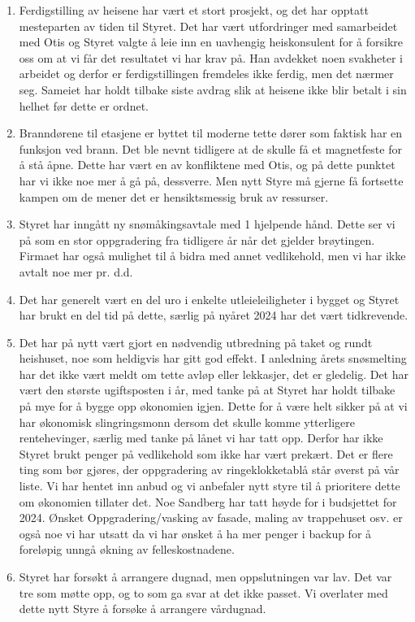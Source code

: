 \documentclass[12pt]{article}
\begin{document}
\begin{enumerate}
\item Ferdigstilling av heisene har vært et stort prosjekt, og det har opptatt mesteparten av tiden til Styret. Det har vært utfordringer med samarbeidet med Otis og Styret valgte å leie inn en uavhengig heiskonsulent for å forsikre oss om at vi får det resultatet vi har krav på. Han avdekket noen svakheter i arbeidet og derfor er ferdigstillingen fremdeles ikke ferdig, men det nærmer seg. Sameiet har holdt tilbake siste avdrag slik at heisene ikke blir betalt i sin helhet før dette er ordnet.
\item Branndørene til etasjene er byttet til moderne tette dører som faktisk har en funksjon ved brann. Det ble nevnt tidligere at de skulle få et magnetfeste for å stå åpne. Dette har vært en av konfliktene med Otis, og på dette punktet har vi ikke noe mer å gå på, dessverre. Men nytt Styre må gjerne få fortsette kampen om de mener det er hensiktsmessig bruk av ressurser.
\item Styret har inngått ny snømåkingsavtale med 1 hjelpende hånd. Dette ser vi på som en stor oppgradering fra tidligere år når det gjelder brøytingen. Firmaet har også mulighet til å bidra med annet vedlikehold, men vi har ikke avtalt noe mer pr. d.d.
\item Det har generelt vært en del uro i enkelte utleieleiligheter i bygget og Styret har brukt en del tid på dette, særlig på nyåret 2024 har det vært tidkrevende.
\item Det har på nytt vært gjort en nødvendig utbredning på taket og rundt heishuset, noe som heldigvis har gitt god effekt. I anledning årets snøsmelting har det ikke vært meldt om tette avløp eller lekkasjer, det er gledelig. Det har vært den største ugiftsposten i år, med tanke på at Styret har holdt tilbake på mye for å bygge opp økonomien igjen. Dette for å være helt sikker på at vi har økonomisk slingringsmonn dersom det skulle komme ytterligere rentehevinger, særlig med tanke på lånet vi har tatt opp. Derfor har ikke Styret brukt penger på vedlikehold som ikke har vært prekært. Det er flere ting som bør gjøres, der oppgradering av ringeklokketablå står øverst på vår liste. Vi har hentet inn anbud og vi anbefaler nytt styre til å prioritere dette om økonomien tillater det. Noe Sandberg har tatt høyde for i budsjettet for 2024. Ønsket Oppgradering/vasking av fasade, maling av trappehuset osv. er også noe vi har utsatt da vi har ønsket å ha mer penger i backup for å foreløpig unngå økning av felleskostnadene.
\item Styret har forsøkt å arrangere dugnad, men oppslutningen var lav. Det var tre som møtte opp, og to som ga svar at det ikke passet. Vi overlater med dette nytt Styre å forsøke å arrangere vårdugnad.
\end{enumerate}
\end{document}
